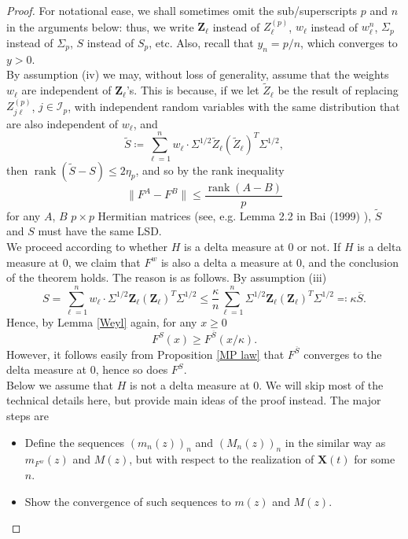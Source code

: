 \documentclass[a4paper,11pt]{book}
\theoremstyle{plain}
\theoremstyle{definition}
\begin{document}
    \begin{proof}
    	For notational ease, we shall sometimes omit the sub/superscripts $p$ and $n$ in the arguments below: thus, we write $\mathbf{Z}_\ell$ instead of $Z_\ell^{(p)}$, $w_\ell$ instead of $w_\ell^n$, $\Sigma_p$ instead of $\Sigma_p$, $S$ instead of $S_p$, etc. Also, recall that $y_n = p/n$, which converges to $y > 0$. \\
    	By assumption (iv) we may, without loss of generality, assume that the weights $w_\ell$ are independent of $\mathbf{Z}_\ell$'s. This is because, if we let $\widetilde{Z}_\ell$ be the result of replacing $Z_{j \ell}^{(p)}$, $j \in \mathcal{I}_p$, with independent random variables with the same distribution that are also independent of $w_\ell$, and
    	\[ \widetilde{S}\coloneqq \sum_{\ell=1}^{n} w_\ell \cdot \Sigma^{1/2} \widetilde{Z}_\ell (\widetilde{Z}_\ell)^T \Sigma^{1/2}, \]
    	then $\operatorname{rank}(\widetilde{S}-S) \leq 2 \eta_p$, and so by the rank inequality
    	\[ \| F^A - F^B \| \leq \frac{\operatorname{rank}(A-B)}{p} \]
    	for any $A$, $B$ $p \times p$ Hermitian matrices (see, e.g. Lemma 2.2 in Bai (1999) \cite{Bai}), $\widetilde{S}$ and $S$ must have the same LSD. \\
    	We proceed according to whether $H$ is a delta measure at $0$ or not. If $H$ is a delta measure at $0$, we claim that $F^w$ is also a delta a measure at $0$, and the conclusion of the theorem holds. The reason is as follows. By assumption (iii) 
    	\[ S = \sum_{\ell = 1}^{n} w_\ell \cdot \Sigma^{1/2} \mathbf{Z}_\ell (\mathbf{Z}_\ell)^T \Sigma^{1/2} \leq \frac{\kappa}{n} \sum_{\ell=1}^{n}\Sigma^{1/2} \mathbf{Z}_\ell (\mathbf{Z}_\ell)^T \Sigma^{1/2} \eqqcolon \kappa \overline{S}.   \]
    	Hence, by Lemma \ref{Weyl} again, for any $x \geq 0$
    	\[ F^S(x) \geq F^{\overline{S}}(x/\kappa). \]
    	However, it follows easily from Proposition \ref{MP law} that $F^{\overline{S}}$ converges to the delta measure at $0$, hence so does $F^S$. \\
    	Below we assume that $H$ is not a delta measure at $0$. 
    	We will skip most of the technical details here, but provide main ideas of the proof instead. The major steps are
    	\begin{itemize}
    		\item Define the sequences $(m_n(z))_n$ and $(M_n(z))_n$ in the similar way as $m_{F^w}(z)$ and $M(z)$, but with respect to the realization of $\mathbf{X}(t)$ for some $n$.
    		\item Show the convergence of such sequences to $m(z)$ and $M(z)$.

\end{itemize}
\end{proof}
\end{document}
